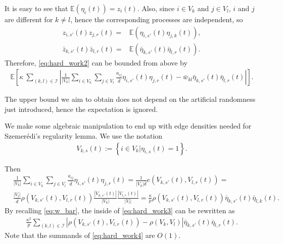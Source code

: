 \documentclass{article}
\newcommand{\E}{\mathbb{E}}
\newcommand{\1}[1]{{\mathds{1}}_{\left\{#1\right\}}}
\begin{document}
	It is easy to see that $\E \left(\eta_{i}(t)\right)=z_{i}(t).$ Also, since $i \in V_k$ and $j \in V_l$, $i$ and $j$ are different for $k \neq l$, hence the corresponding processes are independent, so
	\begin{align*}
		z_{i,s'}(t)z_{j,r}(t)=&\E \left(\eta_{i,s'}(t)\eta_{j,k}(t)\right),\\
		\bar{z}_{k,s'}(t)\bar{z}_{l,r}(t)=& \E \left(\bar{\eta}_{k,s'}(t)\bar{\eta}_{l,r}(t)\right).
	\end{align*}
	Therefore, \eqref{eq:hard_work2} can be bounded from above by
	\begin{align}
		\label{eq:hard_work3}
		\E \left[\kappa\ \sum_{(k,l) \in \mathcal{I}} \left| \frac{1}{|V_k|}\sum_{i \in V_k}\sum_{j \in V_l} \frac{a_{ij}}{\bar{d}}\eta_{i,s'}(t)\eta_{j,r}(t)-\bar{w}_{kl}\bar{\eta}_{k,s'}(t)\bar{\eta}_{l,r}(t) \right| \right].	
	\end{align}
	
	The upper bound we aim to obtain does not depend on the artificial randomness just introduced, hence the expectation is ignored.
	
	We make some algebraic manipulation to end up with edge densities needed for Szemer\'edi's regularity lemma. We use the notation
	\begin{align*}
		V_{k,s}(t):=\left\{\left. i \in V_k \right| \eta_{i,s}(t)=1\right\}.
	\end{align*}
	
	Then
	\begin{align*}
		& \frac{1}{|V_k|}\sum_{i \in V_k}\sum_{j \in V_l} \frac{a_{ij}}{\bar{d}}\eta_{i,s'}(t)\eta_{j,r}(t)=\frac{1}{\left |V_k \right | \bar{d}}e \left(V_{k,s'}(t),V_{l,r}(t) \right)=\\
		& \frac{\left |V_l \right |}{ \bar{d}}\rho \left(V_{k,s'}(t),V_{l,r}(t) \right) \frac{\left| V_{k,s'}(t)\right|}{\left|V_k \right|}\frac{\left| V_{l,r}(t)\right|}{\left|V_l \right|}=\frac{\kappa}{p}\rho \left(V_{k,s'}(t),V_{l,r}(t) \right) \bar{\eta}_{k,s'}(t)\bar{\eta}_{l,k}(t).
	\end{align*}
	By recalling \eqref{eq:w_bar}, the inside of \eqref{eq:hard_work3} can be rewritten as
	\begin{align}
		\label{eq:hard_work4}
		\frac{\kappa^2}{p} \sum_{(k,l) \in \mathcal{I}} \left| \rho\left(V_{k,s'}(t),V_{l,r}(t)\right)-\rho\left(V_{k},V_{l}\right)  \right| \bar{\eta}_{k,s'}(t)\bar{\eta}_{l,r}(t).
	\end{align}
	Note that the summands of \eqref{eq:hard_work4} are $O(1)$. 
	
\end{document}
